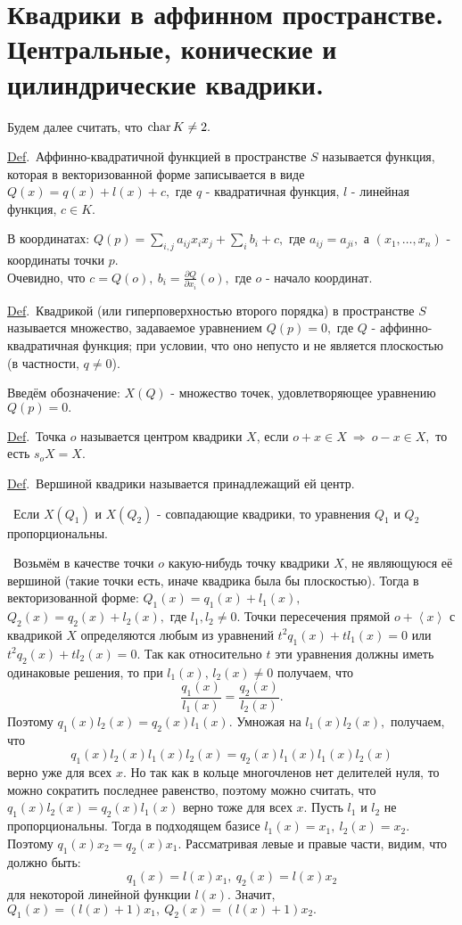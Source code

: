 \documentclass[a4paper]{article}%
\renewcommand{\de}{\par\noindent\underline{Def}.\ }%
\renewcommand{\ab}{\par\noindent}%
\newcommand{\te}{\par\noindent{\bf Теорема.}\ }%
\newcommand{\dok}{\par\noindent{\textsl{Доказательство}.}\ }%
\newcommand{\lob}[1]{\left\langle#1\right\rangle}%
\newcommand{\rom}[1]{{\rm#1\,}}
\begin{document}
\section{Квадрики в аффинном пространстве.\\ Центральные, конические и цилиндрические квадрики.}
\label{q44}
Будем далее считать, что $\rom{char}K\ne 2.$
\de Аффинно-квадратичной функцией в пространстве $S$ называется функция, которая в векторизованной форме записывается
в виде $Q(x)=q(x)+l(x)+c,$ где $q$ - квадратичная функция, $l$ - линейная функция, $c\in K.$
\ab В координатах: $Q(p)=\sum\limits_{i,j}a_{ij}x_ix_j+\sum\limits_ib_i+c,$ где $a_{ij}=a_{ji},$ а $(x_1,\dots,x_n)$ -
координаты точки $p$.\\ Очевидно, что $c=Q(o),\ b_i=\frac{\displaystyle \partial Q}{\displaystyle \partial x_i}(o),$ где $o$ -
начало координат.
\de Квадрикой (или гиперповерхностью второго порядка) в пространстве $S$ называется множество, задаваемое уравнением $Q(p)=0,$
где $Q$ - аффинно-квадратичная функция; при условии, что оно непусто и не является плоскостью
(в частности, $q\ne 0$).
\ab Введём обозначение: $X(Q)$ - множество точек, удовлетворяющее уравнению $Q(p)=0.$
\de Точка $o$ называется центром квадрики $X$, если $o+x\in X\ \Rightarrow\ o-x\in X,$ то есть $s_oX=X.$
\de Вершиной квадрики называется принадлежащий ей центр.
\te Если $X(Q_1)$ и $X(Q_2)$ - совпадающие квадрики, то уравнения $Q_1$ и $Q_2$ пропорциональны.
\dok Возьмём в качестве точки $o$ какую-нибудь точку квадрики $X$, не являющуюся её вершиной (такие точки есть, иначе
квадрика была бы плоскостью). Тогда в
векторизованной форме: $Q_1(x)=q_1(x)+l_1(x),$\ \  $Q_2(x)=q_2(x)+l_2(x),$ где $l_1,l_2\ne 0.$ Точки пересечения прямой $o+\lob{x}$
с квадрикой $X$ определяются любым из уравнений $t^2q_1(x)+tl_1(x)=0$ или $t^2q_2(x)+tl_2(x)=0.$ Так как относительно $t$
эти уравнения должны иметь одинаковые решения, то при $l_1(x),\,l_2(x)\ne 0$ получаем, что
$$
\frac{q_1(x)}{l_1(x)}=\frac{q_2(x)}{l_2(x)}.
$$
Поэтому $q_1(x)l_2(x)=q_2(x)l_1(x).$ Умножая на $l_1(x)l_2(x),$ получаем, что $$q_1(x)l_2(x)l_1(x)l_2(x)=q_2(x)l_1(x)l_1(x)l_2(x)$$
верно уже для всех $x$.
Но так как в кольце многочленов нет делителей нуля, то можно сократить последнее равенство, поэтому можно считать, что
$q_1(x)l_2(x)=q_2(x)l_1(x)$ верно тоже для всех $x$. Пусть $l_1$ и $l_2$ не пропорциональны. Тогда в подходящем базисе
$l_1(x)=x_1,\ l_2(x)=x_2.$ Поэтому $q_1(x)x_2=q_2(x)x_1.$ Рассматривая левые и правые части, видим, что должно быть:
$$q_1(x)=l(x)x_1,\ q_2(x)=l(x)x_2$$ для некоторой линейной функции $l(x).$ Значит, $Q_1(x)=(l(x)+1)x_1,\ Q_2(x)=(l(x)+1)x_2.$
\end{document}
